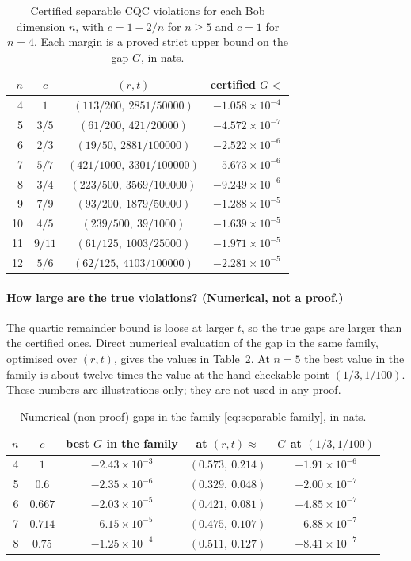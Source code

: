 \begin{table}[ht]
\centering\small
\caption{Certified separable CQC violations for each Bob dimension $n$,
with $c=1-2/n$ for $n\geq5$ and $c=1$ for $n=4$.  Each margin is a
proved strict upper bound on the gap $G$, in nats.}
\label{tab:margins}
\begin{tabular}{rccc}
\toprule
$n$ & $c$ & $(r,t)$ & certified $G<$\\
\midrule
4 & $1$ & $(113/200,\ 2851/50000)$ & $-1.058\times10^{-4}$\\
5 & $3/5$ & $(61/200,\ 421/20000)$ & $-4.572\times10^{-7}$\\
6 & $2/3$ & $(19/50,\ 2881/100000)$ & $-2.522\times10^{-6}$\\
7 & $5/7$ & $(421/1000,\ 3301/100000)$ & $-5.673\times10^{-6}$\\
8 & $3/4$ & $(223/500,\ 3569/100000)$ & $-9.249\times10^{-6}$\\
9 & $7/9$ & $(93/200,\ 1879/50000)$ & $-1.288\times10^{-5}$\\
10 & $4/5$ & $(239/500,\ 39/1000)$ & $-1.639\times10^{-5}$\\
11 & $9/11$ & $(61/125,\ 1003/25000)$ & $-1.971\times10^{-5}$\\
12 & $5/6$ & $(62/125,\ 4103/100000)$ & $-2.281\times10^{-5}$\\
\bottomrule
\end{tabular}
\end{table}

\paragraph{How large are the true violations? (Numerical, not a proof.)}
The quartic remainder bound is loose at larger $t$, so the true gaps are
larger than the certified ones.  Direct numerical evaluation of the gap in
the same family, optimised over $(r,t)$, gives the values in
Table~\ref{tab:numeric}.  At $n=5$ the best value in the family is about
twelve times the value at the hand-checkable point $(1/3,1/100)$.  These
numbers are illustrations only; they are not used in any proof.

\begin{table}[ht]
\centering\small
\caption{Numerical (non-proof) gaps in the family
\eqref{eq:separable-family}, in nats.}
\label{tab:numeric}
\begin{tabular}{rcccc}
\toprule
$n$ & $c$ & best $G$ in the family & at $(r,t)\approx$ & $G$ at $(1/3,1/100)$\\
\midrule
4 & $1$ & $-2.43\times10^{-3}$ & $(0.573,\ 0.214)$ & $-1.91\times10^{-6}$\\
5 & $0.6$ & $-2.35\times10^{-6}$ & $(0.329,\ 0.048)$ & $-2.00\times10^{-7}$\\
6 & $0.667$ & $-2.03\times10^{-5}$ & $(0.421,\ 0.081)$ & $-4.85\times10^{-7}$\\
7 & $0.714$ & $-6.15\times10^{-5}$ & $(0.475,\ 0.107)$ & $-6.88\times10^{-7}$\\
8 & $0.75$ & $-1.25\times10^{-4}$ & $(0.511,\ 0.127)$ & $-8.41\times10^{-7}$\\
\bottomrule
\end{tabular}
\end{table}


